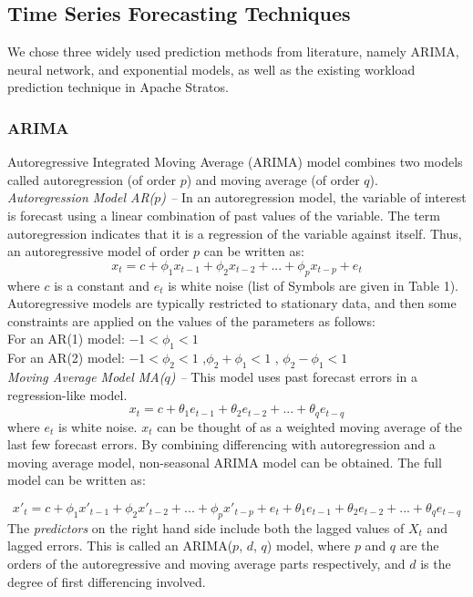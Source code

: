 \subsection{Time Series Forecasting Techniques}
We chose three widely used prediction methods from literature, namely ARIMA, neural network, and exponential models, as well as the existing workload prediction technique in Apache Stratos.

\subsubsection{ARIMA}
Autoregressive Integrated Moving Average (ARIMA) model combines two models called autoregression (of order $p$) and moving average (of order $q$).\\

\noindent
\textit{Autoregression Model AR($p$) --}
In an autoregression model, the variable of interest is forecast using a linear combination of past values of the variable. The term autoregression indicates that it is a regression of the variable against itself. Thus, an autoregressive model of order $p$ can be written as:
	$$x_t = c + \phi_1x_{ t-1} + \phi_2x_{t-2} +...+ \phi_px_{t-p} + e_{t}$$
where $c$ is a constant and $e_t$ is white noise (list of Symbols are given in Table 1). Autoregressive models are typically restricted to stationary data, and then some constraints are applied on the values of the parameters \cite{Forecasting_OTexts} as follows: \\
    For an AR(1) model: $-1 < \phi_{1} < 1$ \\
    For an AR(2) model: $-1 < \phi_{2} < 1$ ,$\phi_{2}+ \phi_{1} < 1$ , $\phi_{2} - \phi_{1} < 1$ \\

\noindent
\textit{Moving Average Model MA($q$) --}
This model uses past forecast errors in a regression-like model.
	$$x_t = c + \theta_1e_{ t-1} + \theta_2e_{t-2} +...+ \theta_qe_{t-q}$$
where $e_t$ is white noise. $x_t$ can be thought of as a weighted moving average of the last few forecast errors. 
By combining differencing with autoregression and a moving average model, non-seasonal ARIMA model can be obtained. The full model can be written as:

	$${x}'_t = c+ \phi_1{x}'_{ t-1} + \phi_2{x}'_{t-2} +...+ \phi_p{x}'_{t-p} + e_{t} + \theta_1e_{ t-1} + \theta_2e_{t-2} +...+ \theta_qe_{t-q}$$
The \textit{predictors} on the right hand side include both the lagged values of $X_t$ and lagged errors. This is called an ARIMA($p$, $d$, $q$) model, where $p$ and $q$ are the orders of the autoregressive and moving average parts respectively, and $d$ is the degree of first differencing involved.


